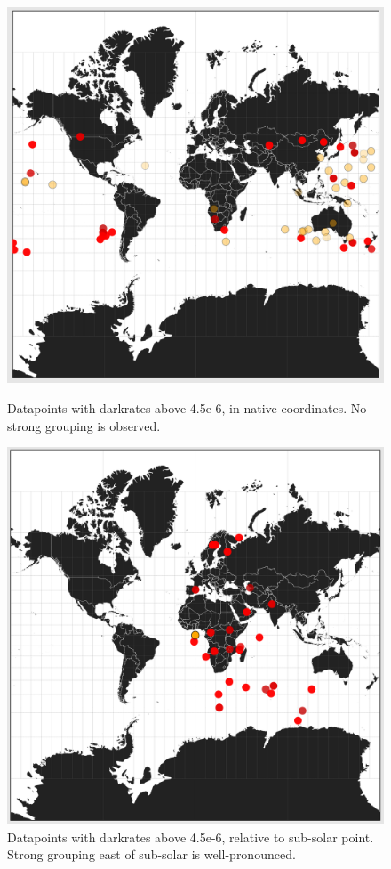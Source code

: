 \documentclass[a4paper,11pt]{article}
\begin{document}
\begin{figure}[!tbp]
  \centering
  \begin{minipage}[b]{0.4\textwidth}
    \includegraphics[width=\textwidth]{lat-long.png}
    \caption{Datapoints with darkrates above 4.5e-6, in native coordinates.  No strong grouping is observed.}
  \end{minipage}
  \hfill
  \begin{minipage}[b]{0.4\textwidth}
    \includegraphics[width=\textwidth]{sub-solar.png}
    \caption{Datapoints with darkrates above 4.5e-6, relative to sub-solar point.  Strong grouping east of sub-solar is 
    well-pronounced.}
  \end{minipage}
\end{figure}
\end{document}
